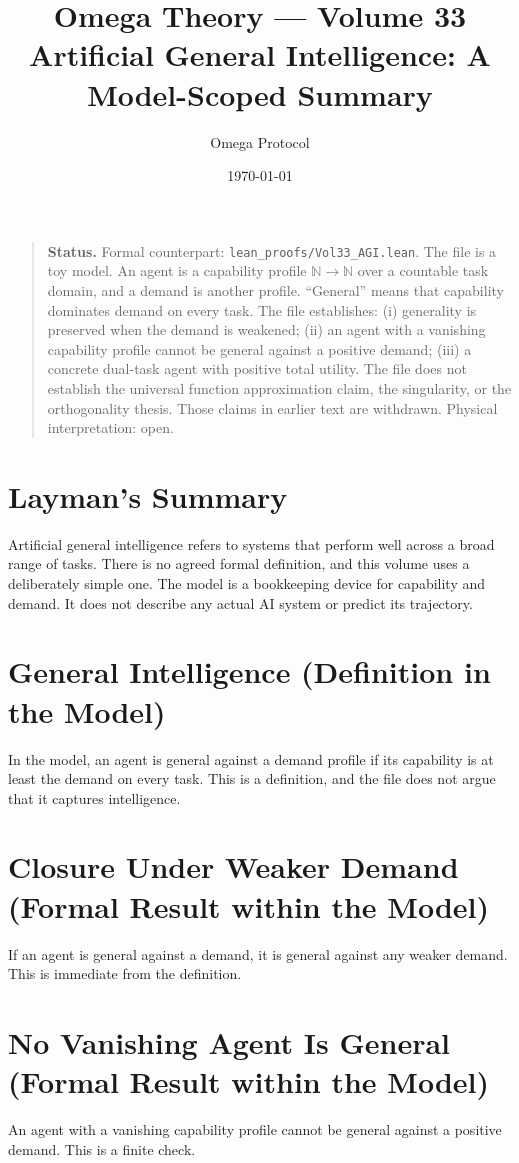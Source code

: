 \documentclass[11pt, a4paper]{article}
\title{Omega Theory --- Volume 33\\\Large Artificial General Intelligence: A Model-Scoped Summary}
\author{Omega Protocol}
\date{\today}
\begin{document}
\maketitle

\begin{quote}
\textbf{Status.} Formal counterpart: \texttt{lean\_proofs/Vol33\_AGI.lean}. The file is a toy model. An agent is a capability profile $\mathbb{N} \to \mathbb{N}$ over a countable task domain, and a demand is another profile. ``General'' means that capability dominates demand on every task. The file establishes: (i) generality is preserved when the demand is weakened; (ii) an agent with a vanishing capability profile cannot be general against a positive demand; (iii) a concrete dual-task agent with positive total utility. The file does not establish the universal function approximation claim, the singularity, or the orthogonality thesis. Those claims in earlier text are withdrawn. Physical interpretation: open.
\end{quote}

\section*{Layman's Summary}
Artificial general intelligence refers to systems that perform well across a broad range of tasks. There is no agreed formal definition, and this volume uses a deliberately simple one. The model is a bookkeeping device for capability and demand. It does not describe any actual AI system or predict its trajectory.

\section{General Intelligence (Definition in the Model)}
In the model, an agent is general against a demand profile if its capability is at least the demand on every task. This is a definition, and the file does not argue that it captures intelligence.

\section{Closure Under Weaker Demand (Formal Result within the Model)}
If an agent is general against a demand, it is general against any weaker demand. This is immediate from the definition.

\section{No Vanishing Agent Is General (Formal Result within the Model)}
An agent with a vanishing capability profile cannot be general against a positive demand. This is a finite check.
\end{document}
